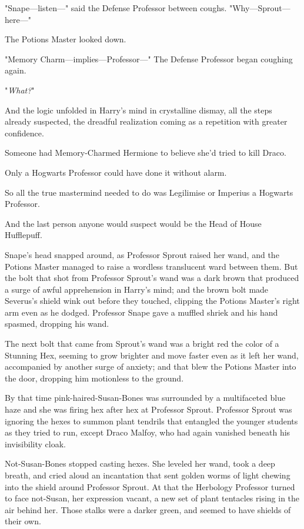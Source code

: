 "Snape—listen—" said the Defense Professor between coughs.
"Why—Sprout—here—"

The Potions Master looked down.

"Memory Charm—implies—Professor—" The Defense Professor began coughing
again.

"\emph{What?}"

And the logic unfolded in Harry's mind in crystalline dismay, all the steps
already suspected, the dreadful realization coming as a repetition with greater
confidence.

Someone had Memory-Charmed Hermione to believe she'd tried to kill Draco.

Only a Hogwarts Professor could have done it without alarm.

So all the true mastermind needed to do was Legilimise or Imperius a Hogwarts
Professor.

And the last person anyone would suspect would be the Head of House Hufflepuff.

Snape's head snapped around, as Professor Sprout raised her wand, and the
Potions Master managed to raise a wordless translucent ward between them. But
the bolt that shot from Professor Sprout's wand was a dark brown that produced
a surge of awful apprehension in Harry's mind; and the brown bolt made
Severus's shield wink out before they touched, clipping the Potions Master's
right arm even as he dodged. Professor Snape gave a muffled shriek and his hand
spasmed, dropping his wand.

The next bolt that came from Sprout's wand was a bright red the color of a
Stunning Hex, seeming to grow brighter and move faster even as it left her
wand, accompanied by another surge of anxiety; and that blew the Potions Master
into the door, dropping him motionless to the ground.

By that time pink-haired-Susan-Bones was surrounded by a multifaceted blue haze
and she was firing hex after hex at Professor Sprout. Professor Sprout was
ignoring the hexes to summon plant tendrils that entangled the younger students
as they tried to run, except Draco Malfoy, who had again vanished beneath his
invisibility cloak.

Not-Susan-Bones stopped casting hexes. She leveled her wand, took a deep
breath, and cried aloud an incantation that sent golden worms of light chewing
into the shield around Professor Sprout. At that the Herbology Professor turned
to face not-Susan, her expression vacant, a new set of plant tentacles rising
in the air behind her. Those stalks were a darker green, and seemed to have
shields of their own.

